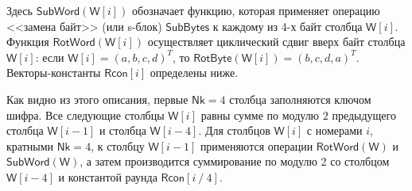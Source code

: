 Здесь $\mathsf{SubWord}(\mathsf{W}[i])$ обозначает функцию, которая применяет операцию <<замена байт>> (или s-блок) $\mathsf{SubBytes}$ к каждому из 4-х байт столбца $\mathsf{W}[i]$. Функция $\mathsf{RotWord}(\mathsf{W}[i])$ осуществляет циклический сдвиг вверх байт столбца $\mathsf{W}[i]$: если $\mathsf{W}[i] = (a, b, c, d)^T$, то $\mathsf{RotByte}(\mathsf{W}[i]) = (b, c, d, a)^T$. Векторы-константы $\mathsf{Rcon}[i]$ определены ниже.

Как видно из этого описания, первые $\mathsf{Nk} = 4$ столбца заполняются ключом шифра. Все следующие столбцы $\mathsf{W}[i]$ равны сумме по модулю $2$ предыдущего столбца $\mathsf{W}[i-1]$ и столбца $\mathsf{W}[i-4]$. Для столбцов $\mathsf{W}[i]$ с номерами $i$, кратными $\mathsf{Nk} = 4$, к столбцу $\mathsf{W}[i-1]$ применяются операции $\mathsf{RotWord(W)}$ и $\mathsf{SubWord(W)}$, а затем производится суммирование по модулю 2 со столбцом $\mathsf{W}[i-4]$ и константой раунда $\mathsf{Rcon}[i ~/~ 4]$.


